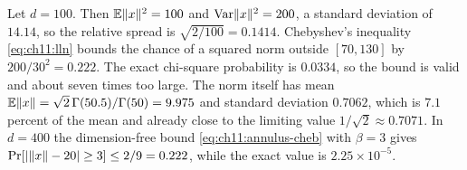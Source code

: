 \begin{example}\label{ex:ch11:norm}
Let $d=100$. Then $\mathbb{E}\lVert x\rVert^2=100$ and $\operatorname{Var}\lVert x\rVert^2=200$, a standard deviation of $14.14$, so the relative spread is $\sqrt{2/100}=0.1414$. Chebyshev's inequality \cref{eq:ch11:lln} bounds the chance of a squared norm outside $[70,130]$ by $200/30^2=0.222$. The exact chi-square probability is $0.0334$, so the bound is valid and about seven times too large. The norm itself has mean $\mathbb{E}\lVert x\rVert=\sqrt2\,\Gamma(50.5)/\Gamma(50)=9.975$ and standard deviation $0.7062$, which is $7.1$ percent of the mean and already close to the limiting value $1/\sqrt2\approx0.7071$. In $d=400$ the dimension-free bound \cref{eq:ch11:annulus-cheb} with $\beta=3$ gives $\Pr[\lvert \lVert x\rVert-20\rvert\ge3]\le2/9=0.222$, while the exact value is $2.25\times10^{-5}$.
\end{example}

